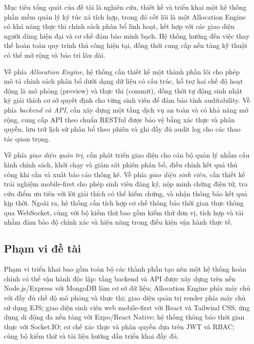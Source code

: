 \documentclass[a4paper,12pt,openany,oneside]{report}
\begin{document}
Mục tiêu tổng quát của đề tài là nghiên cứu, thiết kế và triển khai một hệ
thống phần mềm quản lý ký túc xá tích hợp, trong đó cốt lõi là một Allocation
Engine có khả năng thực thi chính sách phân bổ linh hoạt, kết hợp với các giao
diện người dùng hiện đại và cơ chế đảm bảo minh bạch. Hệ thống hướng đến việc
thay thế hoàn toàn quy trình thủ công hiện tại, đồng thời cung cấp nền tảng kỹ
thuật có thể mở rộng và bảo trì lâu dài.

Về phía \textit{Allocation Engine}, hệ thống cần thiết kế một thành phần lõi
cho phép mô tả chính sách phân bổ dưới dạng dữ liệu có cấu trúc, hỗ trợ hai
chế độ hoạt động là mô phỏng (preview) và thực thi (commit), đồng thời tự động
sinh nhật ký giải thích cơ sở quyết định cho từng sinh viên để đảm bảo tính
auditability. Về phía \textit{backend và API}, cần xây dựng một tầng dịch vụ
an toàn và có khả năng mở rộng, cung cấp API theo chuẩn RESTful được bảo vệ
bằng xác thực và phân quyền, lưu trữ lịch sử phân bổ theo phiên và ghi đầy đủ
audit log cho các thao tác quan trọng.

Về phía \textit{giao diện quản trị}, cần phát triển giao diện cho cán bộ quản
lý nhằm cấu hình chính sách, khởi chạy và giám sát phiên phân bổ, điều chỉnh
kết quả thủ công khi cần và xuất báo cáo thống kê. Về phía \textit{giao diện
sinh viên}, cần thiết kế trải nghiệm mobile-first cho phép sinh viên đăng ký,
nộp minh chứng điện tử, tra cứu điểm ưu tiên với lời giải thích có thể kiểm
chứng, và nhận thông báo kết quả kịp thời. Ngoài ra, hệ thống cần tích hợp cơ
chế thông báo thời gian thực thông qua WebSocket, cùng với bộ kiểm thử bao gồm
kiểm thử đơn vị, tích hợp và tải nhằm đảm bảo độ chính xác và hiệu năng trong
điều kiện vận hành thực tế.

\subsection{Phạm vi đề tài}

Phạm vi triển khai bao gồm toàn bộ các thành phần tạo nên một hệ thống hoàn
chỉnh có thể vận hành độc lập: tầng backend và API được xây dựng trên nền
Node.js/Express với MongoDB làm cơ sở dữ liệu; Allocation Engine phía máy chủ
với đầy đủ chế độ mô phỏng và thực thi; giao diện quản trị render phía máy chủ
sử dụng EJS; giao diện sinh viên web mobile-first với React và Tailwind CSS; ứng
dụng di động đa nền tảng với Expo/React Native; hệ thống thông báo thời gian
thực với Socket.IO; cơ chế xác thực và phân quyền dựa trên JWT và RBAC; cùng
bộ kiểm thử và tài liệu hướng dẫn triển khai đầy đủ.
\end{document}
